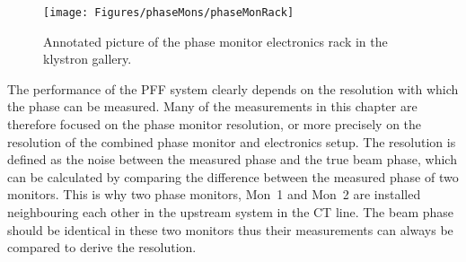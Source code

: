 
\begin{figure}
  \centering
  \texttt{[image: Figures/phaseMons/phaseMonRack]}
  \caption{Annotated picture of the phase monitor electronics rack in the klystron gallery.}
  \label{f:phaseMonRack}
\end{figure}



The performance of the PFF system clearly depends on the resolution with which the phase can be measured. Many of the measurements in this chapter are therefore focused on the phase monitor resolution, or more precisely on the resolution of the combined phase monitor and electronics setup. The resolution is defined as the noise between the measured phase and the true beam phase, which can be calculated by comparing the difference between the measured phase of two monitors. This is why two phase monitors, Mon~1 and Mon~2 are installed neighbouring each other in the upstream system in the CT line. The beam phase should be identical in these two monitors thus their measurements can always be compared to derive the resolution.

